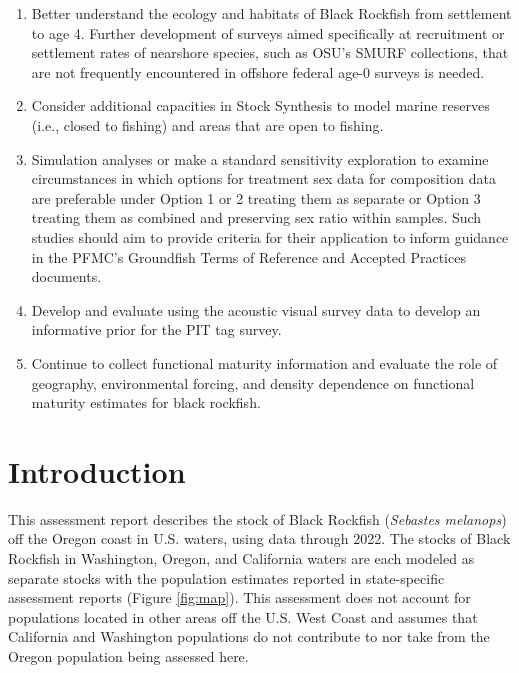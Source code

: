 \documentclass[11pt,
  english,
  letterpaper,
]{article}
\begin{document}
\begin{enumerate}
\item
  Better understand the ecology and habitats of Black Rockfish from settlement to age 4. Further development of surveys aimed specifically at recruitment or settlement rates of nearshore species, such as OSU's SMURF collections, that are not frequently encountered in offshore federal age-0 surveys is needed.
\item
  Consider additional capacities in Stock Synthesis to model marine reserves (i.e., closed to fishing) and areas that are open to fishing.
\item
  Simulation analyses or make a standard sensitivity exploration to examine circumstances in which options for treatment sex data for composition data are preferable under Option 1 or 2 treating them as separate or Option 3 treating them as combined and preserving sex ratio within samples. Such studies should aim to provide criteria for their application to inform guidance in the PFMC's Groundfish Terms of Reference and Accepted Practices documents.
\item
  Develop and evaluate using the acoustic visual survey data to develop an informative prior for the PIT tag survey.
\item
  Continue to collect functional maturity information and evaluate the role of geography, environmental forcing, and density dependence on functional maturity estimates for black rockfish.
\end{enumerate}

\vspace{500cm}

\pagebreak
\setlength{\parskip}{5mm plus1mm minus1mm}
\setcounter{page}{1}
\renewcommand{\thefigure}{\arabic{figure}}
\renewcommand{\thetable}{\arabic{table}}
\setcounter{table}{0}
\setcounter{figure}{0}

\hypertarget{introduction}{%
\section{Introduction}\label{introduction}}

This assessment report describes the stock of Black Rockfish (\emph{Sebastes melanops}) off the Oregon coast in U.S. waters, using data through 2022. The stocks of Black Rockfish in Washington, Oregon, and California waters are each modeled as separate stocks with the population estimates reported in state-specific assessment reports (Figure \ref{fig:map}). This assessment does not account for populations located in other areas off the U.S. West Coast and assumes that California and Washington populations do not contribute to nor take from the Oregon population being assessed here.
\end{document}

